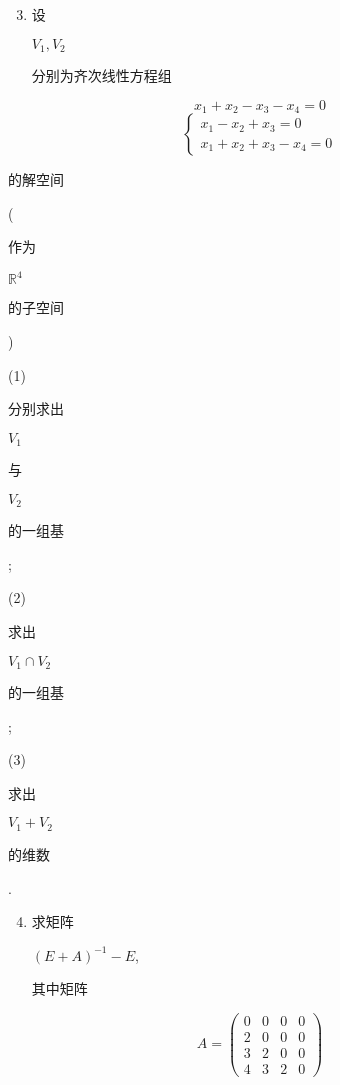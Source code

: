 \documentclass[10pt]{article}
\begin{document}
\begin{enumerate}
  \setcounter{enumi}{2}
  \item \begin{CJK}{UTF8}{mj}设\end{CJK} $V_{1}, V_{2}$ \begin{CJK}{UTF8}{mj}分别为齐次线性方程组\end{CJK}
\end{enumerate}
$$
x_{1}+x_{2}-x_{3}-x_{4}=0
$$
$$
\left\{\begin{array}{l}
x_{1}-x_{2}+x_{3}=0 \\
x_{1}+x_{2}+x_{3}-x_{4}=0
\end{array}\right.
$$
\begin{CJK}{UTF8}{mj}的解空间\end{CJK} (\begin{CJK}{UTF8}{mj}作为\end{CJK} $\mathbb{R}^{4}$ \begin{CJK}{UTF8}{mj}的子空间\end{CJK})

(1) \begin{CJK}{UTF8}{mj}分别求出\end{CJK} $V_{1}$ \begin{CJK}{UTF8}{mj}与\end{CJK} $V_{2}$ \begin{CJK}{UTF8}{mj}的一组基\end{CJK};

(2) \begin{CJK}{UTF8}{mj}求出\end{CJK} $V_{1} \cap V_{2}$ \begin{CJK}{UTF8}{mj}的一组基\end{CJK};

(3) \begin{CJK}{UTF8}{mj}求出\end{CJK} $V_{1}+V_{2}$ \begin{CJK}{UTF8}{mj}的维数\end{CJK}.

\begin{enumerate}
  \setcounter{enumi}{3}
  \item \begin{CJK}{UTF8}{mj}求矩阵\end{CJK} $(E+A)^{-1}-E$, \begin{CJK}{UTF8}{mj}其中矩阵\end{CJK}
\end{enumerate}
$$
A=\left(\begin{array}{llll}
0 & 0 & 0 & 0 \\
2 & 0 & 0 & 0 \\
3 & 2 & 0 & 0 \\
4 & 3 & 2 & 0
\end{array}\right)
$$
\end{document}
